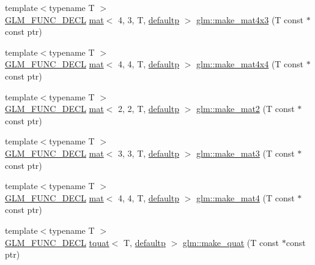 \begin{DoxyCompactItemize}
\item 
{\footnotesize template$<$typename T $>$ }\\\hyperlink{setup_8hpp_ab2d052de21a70539923e9bcbf6e83a51}{G\+L\+M\+\_\+\+F\+U\+N\+C\+\_\+\+D\+E\+CL} \hyperlink{structglm_1_1mat}{mat}$<$ 4, 3, T, \hyperlink{namespaceglm_a36ed105b07c7746804d7fdc7cc90ff25a9d21ccd8b5a009ec7eb7677befc3bf51}{defaultp} $>$ \hyperlink{group__gtc__type__ptr_ga0330bf6640092d7985fac92927bbd42b}{glm\+::make\+\_\+mat4x3} (T const $\ast$const ptr)
\item 
{\footnotesize template$<$typename T $>$ }\\\hyperlink{setup_8hpp_ab2d052de21a70539923e9bcbf6e83a51}{G\+L\+M\+\_\+\+F\+U\+N\+C\+\_\+\+D\+E\+CL} \hyperlink{structglm_1_1mat}{mat}$<$ 4, 4, T, \hyperlink{namespaceglm_a36ed105b07c7746804d7fdc7cc90ff25a9d21ccd8b5a009ec7eb7677befc3bf51}{defaultp} $>$ \hyperlink{group__gtc__type__ptr_ga8f084be30e404844bfbb4a551ac2728c}{glm\+::make\+\_\+mat4x4} (T const $\ast$const ptr)
\item 
{\footnotesize template$<$typename T $>$ }\\\hyperlink{setup_8hpp_ab2d052de21a70539923e9bcbf6e83a51}{G\+L\+M\+\_\+\+F\+U\+N\+C\+\_\+\+D\+E\+CL} \hyperlink{structglm_1_1mat}{mat}$<$ 2, 2, T, \hyperlink{namespaceglm_a36ed105b07c7746804d7fdc7cc90ff25a9d21ccd8b5a009ec7eb7677befc3bf51}{defaultp} $>$ \hyperlink{group__gtc__type__ptr_ga04409e74dc3da251d2501acf5b4b546c}{glm\+::make\+\_\+mat2} (T const $\ast$const ptr)
\item 
{\footnotesize template$<$typename T $>$ }\\\hyperlink{setup_8hpp_ab2d052de21a70539923e9bcbf6e83a51}{G\+L\+M\+\_\+\+F\+U\+N\+C\+\_\+\+D\+E\+CL} \hyperlink{structglm_1_1mat}{mat}$<$ 3, 3, T, \hyperlink{namespaceglm_a36ed105b07c7746804d7fdc7cc90ff25a9d21ccd8b5a009ec7eb7677befc3bf51}{defaultp} $>$ \hyperlink{group__gtc__type__ptr_ga611ee7c4d4cadfc83a8fa8e1d10a170f}{glm\+::make\+\_\+mat3} (T const $\ast$const ptr)
\item 
{\footnotesize template$<$typename T $>$ }\\\hyperlink{setup_8hpp_ab2d052de21a70539923e9bcbf6e83a51}{G\+L\+M\+\_\+\+F\+U\+N\+C\+\_\+\+D\+E\+CL} \hyperlink{structglm_1_1mat}{mat}$<$ 4, 4, T, \hyperlink{namespaceglm_a36ed105b07c7746804d7fdc7cc90ff25a9d21ccd8b5a009ec7eb7677befc3bf51}{defaultp} $>$ \hyperlink{group__gtc__type__ptr_gae7bcedb710d1446c87fd1fc93ed8ee9a}{glm\+::make\+\_\+mat4} (T const $\ast$const ptr)
\item 
{\footnotesize template$<$typename T $>$ }\\\hyperlink{setup_8hpp_ab2d052de21a70539923e9bcbf6e83a51}{G\+L\+M\+\_\+\+F\+U\+N\+C\+\_\+\+D\+E\+CL} \hyperlink{structglm_1_1tquat}{tquat}$<$ T, \hyperlink{namespaceglm_a36ed105b07c7746804d7fdc7cc90ff25a9d21ccd8b5a009ec7eb7677befc3bf51}{defaultp} $>$ \hyperlink{group__gtc__type__ptr_gaadafb6600af2633e4c98cc64c72f5269}{glm\+::make\+\_\+quat} (T const $\ast$const ptr)

\end{DoxyCompactItemize}
